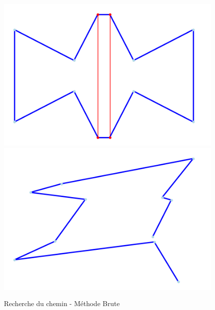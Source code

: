 \documentclass{article}
\begin{document}
\begin{figure}[h!]
	\centering
	\includegraphics[scale=0.4]{image/Exemple8dechet.png}
	\includegraphics[scale=0.4]{image/Exmple10dechet.png}
	\caption{Recherche du chemin - Méthode Brute}
	\label{tsp_dechet}
\end{figure}
\end{document}
